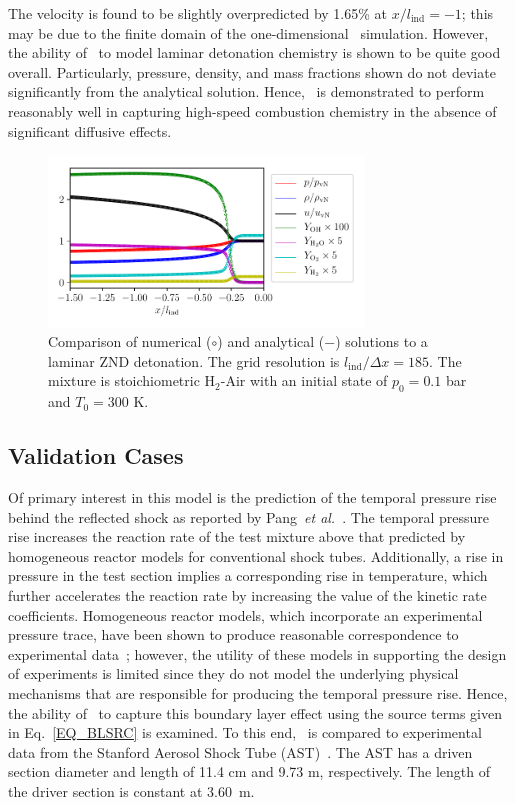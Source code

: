  The velocity is found to be slightly overpredicted by 1.65\% at $x/l_\mathrm{ind}=-1$; this may be due to the finite domain of the one-dimensional \stnshk\ simulation. However, the ability of \stnshk\ to model laminar detonation chemistry is shown to be quite good overall. Particularly, pressure, density, and mass fractions shown do not deviate significantly from the analytical solution. Hence, \stnshk\ is demonstrated to perform reasonably well in capturing high-speed combustion chemistry in the absence of significant diffusive effects.

\begin{figure}[!ht!]
	\centering
	\includegraphics[width=84mm]{ZNDDetonation}
	\caption{\label{FIG_ZND} Comparison of numerical ($\circ$) and analytical ($-$) solutions to a laminar ZND detonation. The grid resolution is $l_\mathrm{ind}/\Delta x=185$. The mixture is stoichiometric H$_2$-Air with an initial state of $p_0=0.1$ bar and $T_0=300$ K.} 
\end{figure}

\subsection{Validation Cases}

Of primary interest in this model is the prediction of the temporal pressure rise behind the reflected shock as reported by Pang~\emph{et al.}~\cite{PANG_DAVIDSON_HANSON_PCI32}. The temporal pressure rise increases the reaction rate of the test mixture above that predicted by homogeneous reactor models for conventional shock tubes. Additionally, a rise in pressure in the test section implies a corresponding rise in temperature, which further accelerates the reaction rate by increasing the value of the kinetic rate coefficients. Homogeneous reactor models, which incorporate an experimental pressure trace, have been shown to produce reasonable correspondence to experimental data~\cite{PANG_DAVIDSON_HANSON_PCI32}; however, the utility of these models in supporting the design of experiments is limited since they do not model the underlying physical mechanisms that are responsible for producing the temporal pressure rise. Hence, the ability of \stnshk\ to capture this boundary layer effect using the source terms given in Eq.~\ref{EQ_BLSRC} is examined. To this end, \stnshk\ is compared to experimental data from the Stanford Aerosol Shock Tube (AST)~\cite{CAMPBELL_THESIS}. The AST  has a driven section diameter and length of 11.4 cm and 9.73 m, respectively. The length of the driver section is constant at 3.60~m. 

